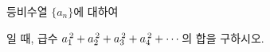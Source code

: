 등비수열 $\{a_n\}$에 대하여 \par\smallskip{}\par\smallskip\noindent 일 때, 급수 $a_1^{\mkern3mu 2}+a_2^{\mkern3mu 2}+a_3^{\mkern3mu 2}+a_4^{\mkern3mu 2}+\cdots$의 합을 구하시오.
